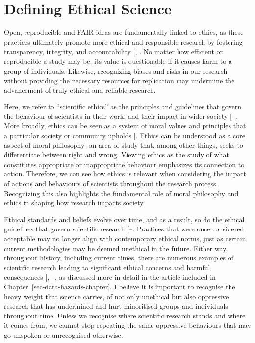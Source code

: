 \documentclass[
  11pt,
  letterpaper,
]{scrreprt}
\begin{document}
\section{Defining Ethical Science}\label{defining-ethical-science}

Open, reproducible and FAIR ideas are fundamentally linked to ethics, as
these practices ultimately promote more ethical and responsible research
by fostering transparency, integrity, and accountability
{[},
\citeproc{ref-kushwaha2024Ethical}{408}{]}. No matter how efficient or
reproducible a study may be, its value is questionable if it causes harm
to a group of individuals. Likewise, recognizing biases and risks in our
research without providing the necessary resources for replication may
undermine the advancement of truly ethical and reliable research.

Here, we refer to ``scientific ethics'' as the principles and guidelines
that govern the behaviour of scientists in their work, and their impact
in wider society
{[}--\citeproc{ref-menapace2019Scientific}{411}{]}.
More broadly, ethics can be seen as a system of moral values and
principles that a particular society or community upholds
{[}\citeproc{ref-gensler2017Ethics}{412}{]}. Ethics can be understood as
a core aspect of moral philosophy -an area of study that, among other
things, seeks to differentiate between right and wrong. Viewing ethics
as the study of what constitutes appropriate or inappropriate behaviour
emphasizes its connection to action. Therefore, we can see how ethics is
relevant when considering the impact of actions and behaviours of
scientists throughout the research process. Recognizing this also
highlights the fundamental role of moral philosophy and ethics in
shaping how research impacts society.

Ethical standards and beliefs evolve over time, and as a result, so do
the ethical guidelines that govern scientific research
{[}--\citeproc{ref-macklin2008Standard}{415}{]}.
Practices that were once considered acceptable may no longer align with
contemporary ethical norms, just as certain current methodologies may be
deemed unethical in the future. Either way, throughout history,
including current times, there are numerous examples of scientific
research leading to significant ethical concerns and harmful
consequences {[},
--\citeproc{ref-birhane2020Decolonising}{418}{]},
as discussed more in detail in the article included in
Chapter~\ref{sec-data-hazards-chapter}. I believe it is important to
recognise the heavy weight that science carries, of not only unethical
but also oppressive research that has undermined and hurt minoritised
groups and individuals throughout time. Unless we recognise where
scientific research stands and where it comes from, we cannot stop
repeating the same oppressive behaviours that may go unspoken or
unrecognised otherwise.
\end{document}
